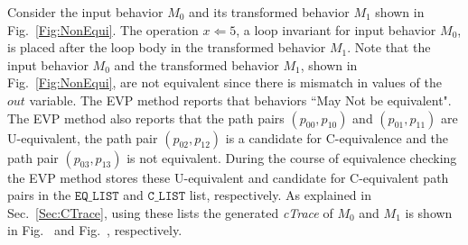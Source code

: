 \begin{example} 
Consider the input behavior $M_0$ and its transformed behavior
$M_1$ shown in Fig.~\ref{Fig:NonEqui}. The operation $x\Leftarrow 5$, a loop
invariant for input behavior $M_0$, is placed after the loop body in the
transformed behavior $M_1$. Note that the input behavior $M_0$ and the
transformed behavior $M_1$, shown in Fig.~\ref{Fig:NonEqui}, are not equivalent
since there is mismatch in values of the  $\mathit{out}$ variable. The EVP
method reports that behaviors ``May Not be equivalent". The EVP method also
reports that the path pairs $(p_{00},p_{10})$ and $(p_{01},p_{11})$ are
U-equivalent, the path pair $(p_{02},p_{12})$ is a candidate for C-equivalence and the path pair
$(p_{03},p_{13})$ is not equivalent.  During the course of equivalence checking
the EVP method stores these U-equivalent and candidate for C-equivalent path pairs in the
$\mathtt{EQ\_LIST}$ and $\mathtt{C\_LIST}$ list, respectively. 
As explained in Sec.~\ref{Sec:CTrace}, using these lists the
generated \textit{cTrace} of $M_0$ and $M_1$ is shown in Fig.~
and Fig.~, respectively.
\end{example} 
